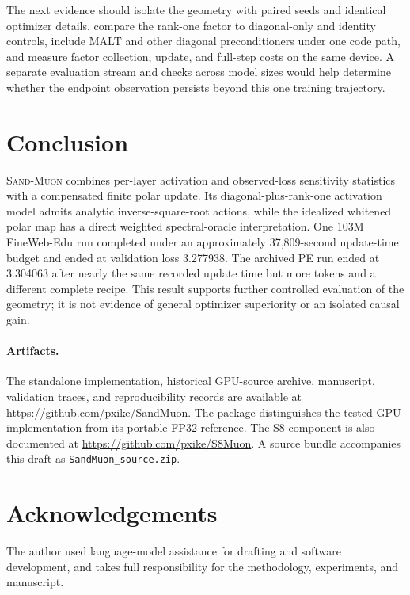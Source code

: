 \documentclass[10pt]{article}
\newcommand{\SAND}{\textsc{Sand-Muon}\xspace}
\begin{document}
The next evidence should isolate the geometry with paired seeds and identical optimizer details, compare the rank-one factor to diagonal-only and identity controls, include MALT and other diagonal preconditioners under one code path, and measure factor collection, update, and full-step costs on the same device. A separate evaluation stream and checks across model sizes would help determine whether the endpoint observation persists beyond this one training trajectory.

\section{Conclusion}
\SAND combines per-layer activation and observed-loss sensitivity statistics with a compensated finite polar update. Its diagonal-plus-rank-one activation model admits analytic inverse-square-root actions, while the idealized whitened polar map has a direct weighted spectral-oracle interpretation. One 103M FineWeb-Edu run completed under an approximately 37,809-second update-time budget and ended at validation loss 3.277938. The archived PE run ended at 3.304063 after nearly the same recorded update time but more tokens and a different complete recipe. This result supports further controlled evaluation of the geometry; it is not evidence of general optimizer superiority or an isolated causal gain.

\paragraph{Artifacts.} The standalone implementation, historical GPU-source archive, manuscript, validation traces, and reproducibility records are available at \url{https://github.com/pxike/SandMuon}. The package distinguishes the tested GPU implementation from its portable FP32 reference. The S8 component is also documented at \url{https://github.com/pxike/S8Muon}. A source bundle accompanies this draft as \texttt{SandMuon\_source.zip}.

\section*{Acknowledgements}
The author used language-model assistance for drafting and software development, and takes full responsibility for the methodology, experiments, and manuscript.




\appendix
\end{document}
